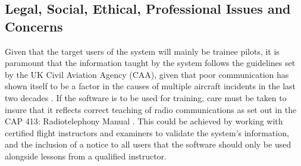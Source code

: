 \subsection{Legal, Social, Ethical, Professional Issues and Concerns}
Given that the target users of the system will mainly be trainee pilots, it is paramount that the information taught by the system follows the guidelines set by the UK Civil Aviation Agency (CAA), given that poor communication has shown itself to be a factor in the causes of multiple aircraft incidents in the last two decades \cite{communication-in-accidents}. If the software is to be used for training, care must be taken to insure that it reflects correct teaching of radio communications as set out in the CAP 413: Radiotelephony Manual \cite{CAP413}. This could be achieved by working with certified flight instructors and examiners to validate the system's information, and the inclusion of a notice to all users that the software should only be used alongside lessons from a qualified instructor.